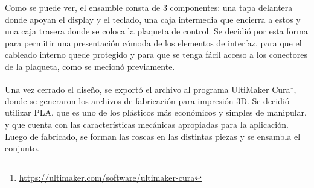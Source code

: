 Como se puede ver, el ensamble consta de 3 componentes: una tapa delantera donde apoyan el display y el teclado, una caja intermedia que encierra a estos y una caja trasera donde se coloca la plaqueta de control. Se decidió por esta forma para permitir una presentación cómoda de los elementos de interfaz, para que el cableado interno quede protegido y para que se tenga fácil acceso a los conectores de la plaqueta, como se mecionó previamente.

Una vez cerrado el diseño, se exportó el archivo al programa UltiMaker Cura\footnote{\url{https://ultimaker.com/software/ultimaker-cura}}, donde se generaron los archivos de fabricación para impresión 3D. Se decidió utilizar PLA, que es uno de los plásticos más económicos y simples de manipular, y que cuenta con las características mecánicas apropiadas para la aplicación. Luego de fabricado, se forman las roscas en las distintas piezas y se ensambla el conjunto.